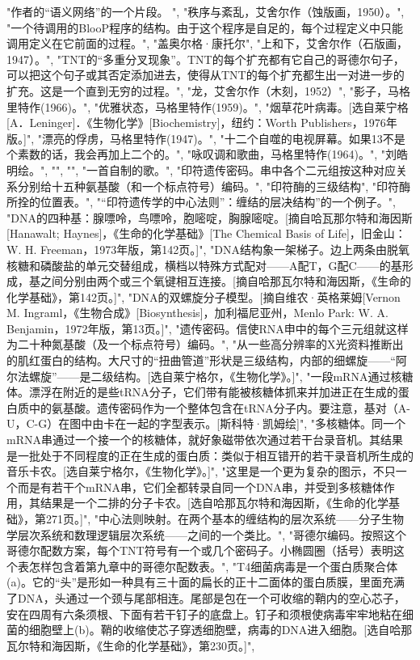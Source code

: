 "作者的“语义网络”的一个片段。 ",
"秩序与紊乱，艾舍尔作（蚀版画，1950）。",
"一个待调用的BlooP程序的结构。由于这个程序是自足的，每个过程定义中只能调用定义在它前面的过程。",
"盖奥尔格·康托尔",
"上和下，艾舍尔作（石版画，1947）。",
"TNT的“多重分叉现象”。TNT的每个扩充都有它自己的哥德尔句子，可以把这个句子或其否定添加进去，使得从TNT的每个扩充都生出一对进一步的扩充。这是一个直到无穷的过程。",
"龙，艾舍尔作（木刻，1952）",
"影子，马格里特作(1966)。",
"优雅状态，马格里特作(1959)。",
"烟草花叶病毒。[选自莱宁格[A．Leninger]．《生物化学》[Biochemistry]，纽约：Worth Publishers，1976年版。]",
"漂亮的俘虏，马格里特作(1947)。",
"\label {fig:81}十二个自噬的电视屏幕。如果13不是个素数的话，我会再加上二个的。",
"\label {fig:82}咏叹调和歌曲，马格里特作(1964)。",
"刘皓明绘。",
"",
"",
"一首自制的歌。",
"印符遗传密码。串中各个二元组按这种对应关系分别给十五种氨基酸（和一个标点符号）编码。",
"印符酶的三级结构",
"印符酶所拴的位置表。",
"“印符遗传学的中心法则”：缠结的层决结构”的一个例子。",
"DNA的四种基：腺嘌呤，鸟嘌呤，胞嘧啶，胸腺嘧啶。[摘自哈瓦那尔特和海因斯[Hanawalt; Haynes]，《生命的化学基础》[The Chemical Basis of Life]，旧金山：W. H. Freeman，1973年版，第142页。]",
"DNA结构象一架梯子。边上两条由脱氧核糖和磷酸盐的单元交替组成，横档以特殊方式配对——A配T，G配C——的基形成，基之间分别由两个或三个氧键相互连接。[摘自哈那瓦尔特和海因斯，《生命的化学基础》，第142页。]",
"DNA的双螺旋分子模型。[摘自维农·英格莱姆[Vernon M. Ingraml，《生物合成》[Biosynthesis]，加利福尼亚州，Menlo Park: W. A. Benjamin，1972年版，第13页。]",
"遗传密码。信使RNA申中的每个三元组就这样为二十种氮基酸（及一个标点符号）编码。",
"从一些高分辨率的X光资料推断出的肌红蛋白的结构。大尺寸的“扭曲管道”形状是三级结构，内部的细螺旋——“阿尔法螺旋”——是二级结构。[选自莱宁格尔，《生物化学》。]",
"一段mRNA通过核糖体。漂浮在附近的是些tRNA分子，它们带有能被核糖体抓来并加进正在生成的蛋白质中的氨基酸。遗传密码作为一个整体包含在tRNA分子内。要注意，基对（A-U，C-G）在图中由卡在一起的字型表示。[斯科特·凯姆绘]",
"多核糖体。同一个mRNA串通过一个接一个的核糖体，就好象磁带依次通过若干台录音机。其结果是一批处于不同程度的正在生成的蛋白质：类似于相互错开的若干录音机所生成的音乐卡农。[选自莱宁格尔，《生物化学》。]",
"这里是一个更为复杂的图示，不只一个而是有若干个mRNA串，它们全都转录自同一个DNA串，并受到多核糖体作用，其结果是一个二排的分子卡农。[选自哈那瓦尔特和海因斯，《生命的化学基础》，第271页。]",
"中心法则映射。在两个基本的缠结构的层次系统——分子生物学层次系统和数理逻辑层次系统——之间的一个类比。",
"哥德尔编码。按照这个哥德尔配数方案，每个TNT符号有一个或几个密码子。小椭圆圈（括号）表明这个表怎样包含着第九章中的哥德尔配数表。",
"T4细菌病毒是一个蛋白质聚合体(a)。它的“头”是形如一种具有三十面的扁长的正十二面体的蛋白质膜，里面充满了DNA，头通过一个颈与尾部相连。尾部是包在一个可收缩的鞘内的空心芯子，安在四周有六条须根、下面有若干钉子的底盘上。钉子和须根使病毒牢牢地粘在细菌的细胞壁上(b)。鞘的收缩使芯子穿透细胞壁，病毒的DNA进入细胞。[选自哈那瓦尔特和海因斯，《生命的化学基础》，第230页。]",
